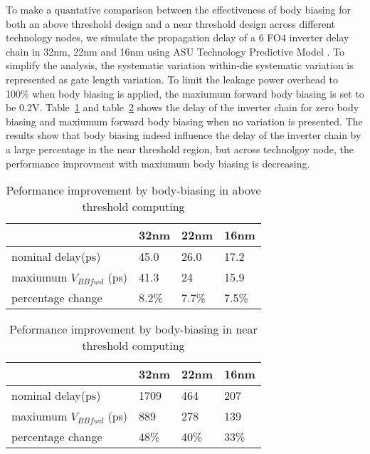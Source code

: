 To make a quantative comparison between the effectiveness of body biasing for both an
above threshold design and a near threshold design across different technology
nodes,  we simulate the propagation  delay of a 6 FO4 inverter delay chain in
32nm, 22nm and 16nm using ASU Technology Predictive Model \cite{PredictiveModel}. To simplify the
analysis, the systematic variation within-die systematic variation is represented as gate length variation. To limit the leakage power overhead to 100\% when body biasing is applied, the maxiumum forward body biasing is set to be 0.2V.  Table~\ref{body1} and table~\ref{body2} shows the delay of the inverter chain for zero body biasing and maxiumum forward body biasing when no variation is presented. The results show that body biasing indeed influence the delay of the inverter chain by a large percentage in the near threshold region, but across technolgoy node, the performance improvment with maxiumum body biasing is decreasing.   


\begin{table}
  \caption {Peformance improvement by body-biasing in above threshold computing} 
  \centering 
  \label {body1}
  \begin{tabular}{ | l | l | l | l | }
    \hline
    & 32nm & 22nm & 16nm \\ \hline
    nominal delay(ps) & 45.0 & 26.0 & 17.2 \\ \hline
    maxiumum $V_{BBfwd}$ (ps)  & 41.3 & 24 & 15.9 \\  \hline
    percentage change  & 8.2\% & 7.7\% & 7.5\% \\ 
    \hline
  \end{tabular}
\end{table}



\begin{table}
  \caption {Peformance improvement by body-biasing in near threshold computing}  
  \centering
  \label {body2}
  \begin{tabular}{ | l | l | l | l | }
    \hline
    & 32nm & 22nm & 16nm \\ \hline
    nominal delay(ps) & 1709 & 464 & 207 \\ \hline
    maxiumum $V_{BBfwd}$ (ps)  & 889 & 278 & 139 \\  \hline
    percentage change  & 48\% & 40\% & 33\% \\ 
    \hline
  \end{tabular}
\end{table}

